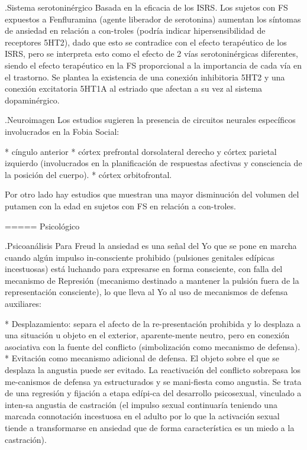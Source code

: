 .Sistema serotoninérgico
Basada en la eficacia de los ISRS. Los sujetos con FS expuestos a Fenfluramina (agente liberador de serotonina) aumentan los síntomas de ansiedad en relación a con-troles (podría indicar hipersensibilidad de receptores 5HT2), dado que esto se contradice con el efecto terapéutico de los ISRS, pero se interpreta esto como el efecto de 2 vías serotoninérgicas diferentes, siendo el efecto terapéutico en la FS proporcional a la importancia de cada vía en el trastorno. Se plantea la existencia de una conexión inhibitoria 5HT2 y una conexión excitatoria 5HT1A al estriado que afectan a su vez al sistema dopaminérgico.

.Neuroimagen
Los estudios sugieren la presencia de circuitos neurales específicos involucrados en la Fobia Social:

* cíngulo anterior
* córtex prefrontal dorsolateral derecho y córtex parietal izquierdo (involucrados en la planificación de respuestas afectivas y consciencia de la posición del cuerpo).
* córtex orbitofrontal.

Por otro lado hay estudios que muestran una mayor disminución del volumen del putamen con la edad en sujetos con FS en relación a con-troles.

===== Psicológico

.Psicoanálisis
Para Freud la ansiedad es una señal del Yo que se pone en marcha cuando algún impulso in-consciente prohibido (pulsiones genitales edípicas incestuosas) está luchando para expresarse en forma consciente, con falla del mecanismo de Represión (mecanismo destinado a mantener la pulsión fuera de la representación consciente), lo que lleva al Yo al uso de mecanismos de defensa auxiliares:

* Desplazamiento: separa el afecto de la re-presentación prohibida y lo desplaza a una situación u objeto en el exterior, aparente-mente neutro, pero en conexión asociativa con la fuente del conflicto (simbolización como mecanismo de defensa).
* Evitación como mecanismo adicional de defensa. El objeto sobre el que se desplaza la angustia puede ser evitado. La reactivación del conflicto sobrepasa los me-canismos de defensa ya estructurados y se mani-fiesta como angustia. Se trata de una regresión y fijación a etapa edípi-ca del desarrollo psicosexual, vinculado a inten-sa angustia de castración (el impulso sexual continuaría teniendo una marcada connotación incestuosa en el adulto por lo que la activación sexual tiende a transformarse en ansiedad que de forma característica es un miedo a la castración).

